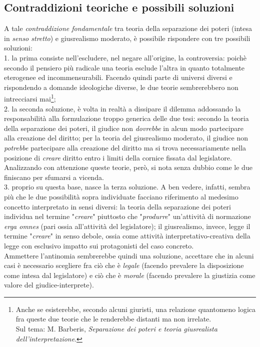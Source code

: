 \subsection{Contraddizioni teoriche e possibili soluzioni}
A tale \textit{contraddizione fondamentale} tra teoria della separazione dei poteri (intesa in \textit{senso stretto}) e giusrealismo moderato, è possibile rispondere con tre possibili soluzioni:
\\1. la prima consiste nell'escludere, nel negare all'origine, la controversia: poichè secondo il pensiero più radicale una teoria esclude l'altra in quanto totalmente eterogenee ed incommensurabili. Facendo quindi parte di universi diversi e rispondendo a domande ideologiche diverse, le due teorie sembrerebbero non intrecciarsi mai\footnote{Anche se esisterebbe, secondo alcuni giuristi, una relazione quantomeno logica fra queste due teorie che le renderebbe distanti ma non irrelate.\\Sul tema: M. Barberis, \textit{Separazione dei poteri e teoria giusrealista dell'interpretazione}.};
\\2. la seconda soluzione, è volta in realtà a dissipare il dilemma addossando la responsabilità alla formulazione troppo generica delle due tesi: secondo la teoria della separazione dei poteri, il giudice non \textit{dovrebbe} in alcun modo partecipare alla creazione del diritto; per la teoria del giusrealismo moderato, il giudice non \textit{potrebbe} partecipare alla creazione del diritto ma si trova necessariamente nella posizione di \textit{creare} diritto entro i limiti della cornice fissata dal legislatore. Analizzando con attenzione queste teorie, però, si nota senza dubbio come le due finiscano per sfumarsi a vicenda.
\\3. proprio su questa base, nasce la terza soluzione. A ben vedere, infatti, sembra più che le due possibilità sopra individuate facciano riferimento al medesimo concetto interpretato in sensi diversi: la teoria della separazione dei poteri individua nel termine "\textit{creare}" piuttosto che "\textit{produrre}" un'attività di normazione \textit{erga omnes} (pari ossia all'attività del legislatore); il giusrealismo, invece, legge il termine "\textit{creare}" in senso debole, ossia come attività interpretativo-creativa della legge con esclusivo impatto sui protagonisti del caso concreto.
\\Ammettere l'antinomia sembrerebbe quindi una soluzione, accettare che in alcuni casi è necessario scegliere fra ciò che è \textit{legale} (facendo prevalere la disposizione come intesa dal legislatore) e ciò che è \textit{morale} (facendo prevalere la giustizia come valore del giudice-interprete).
